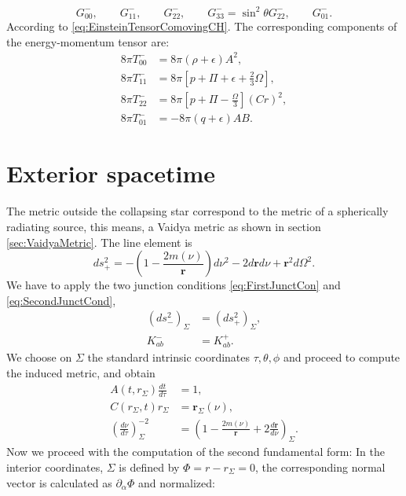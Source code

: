 \begin{equation}
	G_{00}^{-}, \qquad G_{11}^{-} ,\qquad G_{22}^{-} ,\qquad G_{33}^{-} = \sin ^2 \theta G_{22}^{-}, \qquad G_{01}^{-} .
\end{equation}
According to \ref{eq:EinsteinTensorComovingCH}. The corresponding components of the energy-momentum tensor are:
\begin{align}
	8\pi T_{00}^{-} &= 8\pi (\rho + \epsilon)A^2, \\
	8\pi T_{11}^{-} &= 8\pi \left[p + \Pi + \epsilon + \frac{2}{3}\Omega \right],\\
	8\pi T_{22}^{-} &= 8\pi \left[p + \Pi - \frac{\Omega}{3}\right](Cr)^2 ,\\
	8\pi T_{01}^{-} &= -8\pi(q + \epsilon) AB.
\end{align}

\section{Exterior spacetime}
The metric outside the collapsing star correspond to the metric of a spherically radiating source, this means, a Vaidya metric as shown in section \ref{sec:VaidyaMetric}. The line element is
\begin{equation}
	\label{eq:VaidyaMetricB}
	ds^{2}_{+} = - \left(1 - \frac{2m(\nu)}{\textbf{r}}\right)d\nu^2 - 2 d\textbf{r}d\nu + \textbf{r}^2d\Omega^2.
\end{equation}
We have to apply the two junction conditions \ref{eq:FirstJunctCon} and \ref{eq:SecondJunctCond},
\begin{align}
	(ds^{2}_{-})_{\Sigma} &= (ds^{2}_{+})_{\Sigma}, \\
	K_{ab}^{-} &= K_{ab}^{+}.
\end{align}
We choose on $\Sigma$ the standard intrinsic coordinates $\tau, \theta, \phi$ and proceed to compute the induced metric, and obtain
\begin{align}
\label{eq:FirstJcond}
	A(t, r_{\Sigma})\frac{dt}{d\tau} &= 1,\\\nonumber
	C(r_{\Sigma}, t) r_{\Sigma} &= \textbf{r}_{\Sigma}(\nu) ,\\\nonumber
	\left(\frac{d\nu}{d\tau}\right)^{-2}_{\Sigma} &= \left(1 - \frac{2m(\nu)}{\textbf{r}} + 2\frac{d\textbf{r}}{d\nu}\right)_{\Sigma}.
\end{align}
Now we proceed with the computation of the second fundamental form: In the interior coordinates, $\Sigma$ is defined by $\Phi = r - r_{\Sigma} = 0$, the corresponding normal vector is calculated as $\partial_{\alpha}\Phi$ and normalized:
